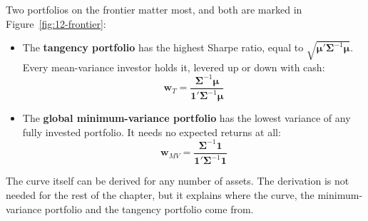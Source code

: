 Two portfolios on the frontier matter most, and both are marked in Figure~\ref{fig:12-frontier}:

\begin{itemize}
  \item The \textbf{tangency portfolio} has the highest Sharpe ratio, equal to $\sqrt{\boldsymbol{\mu}'\boldsymbol{\Sigma}^{-1}\boldsymbol{\mu}}$. Every mean-variance investor holds it, levered up or down with cash:
  \begin{equation}
    \mathbf{w}_T = \frac{\boldsymbol{\Sigma}^{-1}\boldsymbol{\mu}}{\mathbf{1}'\boldsymbol{\Sigma}^{-1}\boldsymbol{\mu}}
    \label{eq:12-tangency}
  \end{equation}
  \item The \textbf{global minimum-variance portfolio} has the lowest variance of any fully invested portfolio. It needs no expected returns at all:
  \begin{equation}
    \mathbf{w}_{MV} = \frac{\boldsymbol{\Sigma}^{-1}\mathbf{1}}{\mathbf{1}'\boldsymbol{\Sigma}^{-1}\mathbf{1}}
    \label{eq:12-minvar}
  \end{equation}
\end{itemize}

The curve itself can be derived for any number of assets. The derivation is not needed for the rest of the chapter, but it explains where the curve, the minimum-variance portfolio and the tangency portfolio come from.

